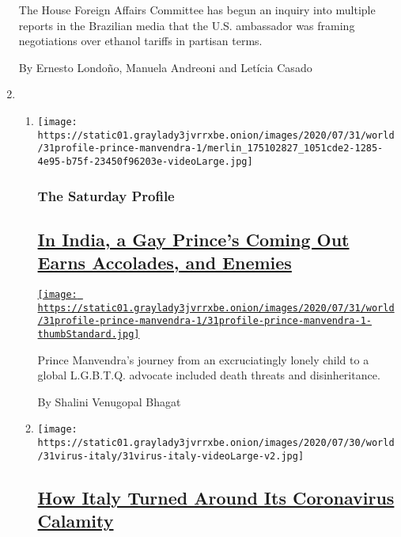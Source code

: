 \begin{enumerate}
  The House Foreign Affairs Committee has begun an inquiry into multiple
  reports in the Brazilian media that the U.S. ambassador was framing
  negotiations over ethanol tariffs in partisan terms.

  By Ernesto Londoño, Manuela Andreoni and Letícia Casado
\item
  \begin{enumerate}
  \def\labelenumii{\arabic{enumii}.}
  \item
    \texttt{[image: https://static01.graylady3jvrrxbe.onion/images/2020/07/31/world/31profile-prince-manvendra-1/merlin\_175102827\_1051cde2-1285-4e95-b75f-23450f96203e-videoLarge.jpg]}

    \hypertarget{the-saturday-profile}{%
    \subsubsection{The Saturday Profile}\label{the-saturday-profile}}

    \hypertarget{in-india-a-gay-princes-coming-out-earns-accolades-and-enemies}{%
    \subsection{\texorpdfstring{\href{/2020/07/31/world/asia/india-prince-manvendra-gay-rights.html}{In
    India, a Gay Prince's Coming Out Earns Accolades, and
    Enemies}}{In India, a Gay Prince's Coming Out Earns Accolades, and Enemies}}\label{in-india-a-gay-princes-coming-out-earns-accolades-and-enemies}}

    \href{/2020/07/31/world/asia/india-prince-manvendra-gay-rights.html}{\texttt{[image: https://static01.graylady3jvrrxbe.onion/images/2020/07/31/world/31profile-prince-manvendra-1/31profile-prince-manvendra-1-thumbStandard.jpg]}}

    Prince Manvendra's journey from an excruciatingly lonely child to a
    global L.G.B.T.Q. advocate included death threats and
    disinheritance.

    By Shalini Venugopal Bhagat
  \item
    \texttt{[image: https://static01.graylady3jvrrxbe.onion/images/2020/07/30/world/31virus-italy/31virus-italy-videoLarge-v2.jpg]}

    \hypertarget{how-italy-turned-around-its-coronavirus-calamity}{%
    \subsection{\texorpdfstring{\href{/2020/07/31/world/europe/italy-coronavirus-reopening.html}{How
    Italy Turned Around Its Coronavirus
    Calamity}}{How Italy Turned Around Its Coronavirus Calamity}}\label{how-italy-turned-around-its-coronavirus-calamity}}


\end{enumerate}
\end{enumerate}
